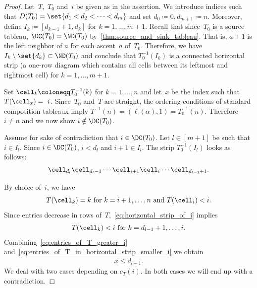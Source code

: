 \begin{proof}
	Let~$T$,~$T_0$ and~$i$ be given as in the assertion. 
	We introduce indices such that
	$D(T_0)= \set{ d_1 < d_2 < \cdots < d_m}$ and set $d_0 \coloneqq 0, d_{m+1} \coloneqq n$. Moreover,
	 define $I_k\coloneqq [d_{k-1}+1 , d_k]$ for $k= 1, \ldots, m+1$. 
	 Recall that since~$T_0$ is a source tableau, $\DC(T_0)= \ND(T_0)$ by~\cref{thm:source_and_sink_tableau}. 
	 That is, $a+1$ is the left neighbor of $a$ for each ascent~$a$ of~$T_0$. Therefore, we have $I_k\setminus \set{d_k} \subset \ND(T_0)$ and conclude that $T^{-1}_0(I_k)$ is a connected horizontal strip (a one-row diagram which contains all cells between its leftmost and rightmost cell) for $k = 1,\dots,m+1$.
	 
	Set $\cell_k \coloneqq T_0^{-1}(k)$ for $k=1,\dots, n$ and let~$x$ be the index such that $T(\cell_x)=~i$. 
	Since~$T_0$ and~$T$ are straight, the ordering conditions of standard composition tableaux imply $T^{-1}(n)= (\ell(\alpha), 1) = T_0^{-1}(n)$. Therefore $i\neq n$ and we now show $i\notin \DC(T_0)$.	
	
	Assume for sake of contradiction that $i\in \DC(T_0)$.
	Let $l\in [m+1]$ be such that $i\in I_l$. 
	Since $i \in \DC(T_0)$, $i<d_l$ and $i+1\in I_l$. 
	The strip $T^{-1}_0(I_l)$ looks as follows:
	\begin{align}
	\label{eq:horizontal_strip_of_i}
	\cell_{d_{l}} \cell_{d_{l} -1} \cdots \cell_{i+1} \cell_i \cdots \cell_{d_{l-1} + 1}.
	\end{align}	

	By choice of~$i$, we have 
	\begin{align}
	\label{eq:entries_of_T_greater_i}
	\text{$T(\cell_k) = k$ for $k=i+1,\dots, n$ and 	$T(\cell_i) < i$.}
	\end{align}
	Since entries decrease in rows of~$T$,~\eqref{eq:horizontal_strip_of_i} implies 
	\begin{align}
	\label{eq:entries_of_T_in_horizontal_strip_smaller_i}
	T(\cell_k) < i \text{ for } k=d_{l-1}+1,\dots , i. 
	\end{align}
	Combining~\eqref{eq:entries_of_T_greater_i} and~\eqref{eq:entries_of_T_in_horizontal_strip_smaller_i} we obtain
	\begin{align}
	\label{eq:bound_for_x}
	 x\leq d_{l-1}.
	\end{align}
	We deal with two cases depending on $c_T(i)$. 
	In both cases we will end up with a contradiction.
	

\end{proof}
